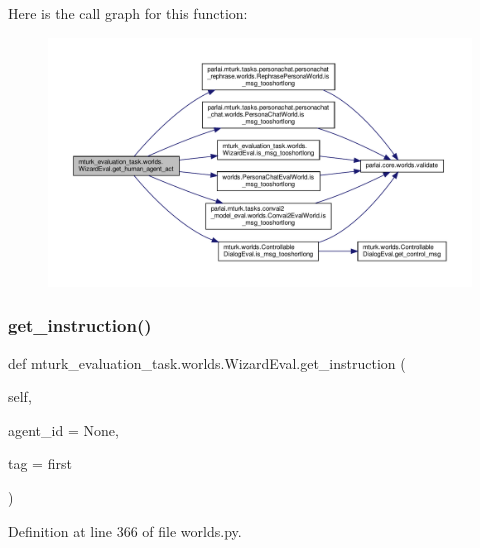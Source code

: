 Here is the call graph for this function\+:
\nopagebreak
\begin{figure}[H]
\begin{center}
\leavevmode
\includegraphics[width=350pt]{classmturk__evaluation__task_1_1worlds_1_1WizardEval_a8d951acf0577bb2cfbfe77f49c9147da_cgraph}
\end{center}
\end{figure}
\mbox{\label{classmturk__evaluation__task_1_1worlds_1_1WizardEval_aca4ed4e6a2e6aefb9f7cf9964b325212}} 
\subsubsection{\texorpdfstring{get\+\_\+instruction()}{get\_instruction()}}
{\footnotesize\ttfamily def mturk\+\_\+evaluation\+\_\+task.\+worlds.\+Wizard\+Eval.\+get\+\_\+instruction (\begin{DoxyParamCaption}\item[{}]{self,  }\item[{}]{agent\+\_\+id = {\ttfamily None},  }\item[{}]{tag = {\ttfamily \textquotesingle{}first\textquotesingle{}} }\end{DoxyParamCaption})}



Definition at line 366 of file worlds.\+py.



